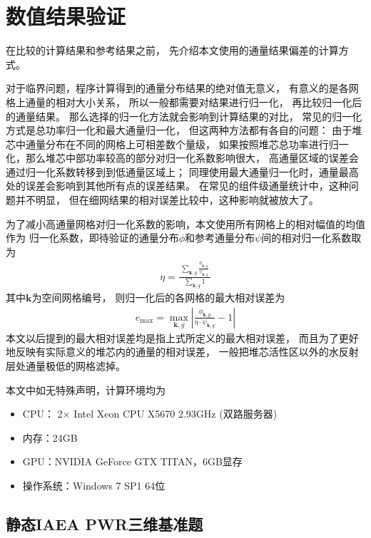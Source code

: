\section{数值结果验证}

在比较\ProgramName 的计算结果和参考结果之前，
先介绍本文使用的通量结果偏差的计算方式。

对于临界问题，程序计算得到的通量分布结果的绝对值无意义，
有意义的是各网格上通量的相对大小关系，
所以一般都需要对结果进行归一化，
再比较归一化后的通量结果。
那么选择的归一化方法就会影响到计算结果的对比，
常见的归一化方式是总功率归一化和最大通量归一化，
但这两种方法都有各自的问题：
由于堆芯中通量分布在不同的网格上可相差数个量级，
如果按照堆芯总功率进行归一化，那么堆芯中部功率较高的部分对归一化系数影响很大，
高通量区域的误差会通过归一化系数转移到到低通量区域上；
同理使用最大通量归一化时，通量最高处的误差会影响到其他所有点的误差结果。
在常见的组件级通量统计中，这种问题并不明显，
但在细网结果的相对误差比较中，这种影响就被放大了。

为了减小高通量网格对归一化系数的影响，本文使用所有网格上的相对幅值的均值作为
归一化系数，即待验证的通量分布$\phi$和参考通量分布$\psi$间的相对归一化系数取为
\begin{align}
  \eta = \frac{\ \displaystyle\sum_{\bm{k},g}\frac{\phi_{\bm{k},g}}{\psi_{\bm{k},g}}\ }
              {\displaystyle\sum_{\bm{k},g}1}
\end{align}
其中$\bm{k}$为空间网格编号，
则归一化后的各网格的最大相对误差为
\begin{align}
  e_\mathrm{max} = \max_{\bm{k},g}
      \left|
        \frac{\phi_{\bm{k},g}}{\eta\cdot\psi_{\bm{k},g}} - 1
      \right|
\end{align}
本文以后提到的最大相对误差均是指上式所定义的最大相对误差，
而且为了更好地反映有实际意义的堆芯内的通量的相对误差，
一般把堆芯活性区以外的水反射层处通量极低的网格滤掉。

本文中如无特殊声明，计算环境均为
\begin{itemize}
\item CPU： 2$\times$ Intel Xeon CPU X5670 2.93GHz (双路服务器)
\item 内存：24GB
\item GPU：NVIDIA GeForce GTX TITAN，6GB显存
\item 操作系统：Windows 7 SP1 64位
\end{itemize}

\subsection{静态IAEA PWR三维基准题}

